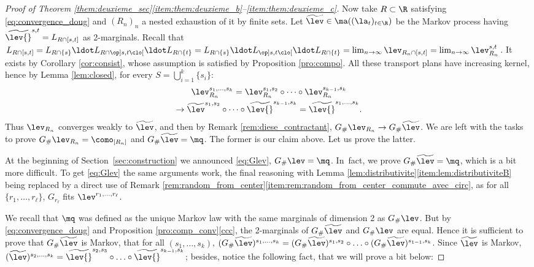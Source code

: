 \begin{proof}[Proof of Theorem \ref{them:deuxieme_sec}\eqref{item:them:deuxieme_b}--\eqref{item:them:deuxieme_c}]
Now take $R\subset \R$ satisfying \eqref{eq:convergence_doug} and $(R_n)_n$ a nested exhaustion of it by finite sets. Let $\widetilde\lev\in\ma((\la_t)_{t\in\R})$ be the Markov process having $\widetilde\lev{}^{s,t}= L_{R\cap[s,t]}$ as 2\nobreakdash-mar\-ginals. Recall that $L_{R\cap[s,t]}=L_{R\cap \{s\}}{}\ldot L_{R\cap\op]s,t\clo[}{}\ldot L_{R\cap \{t\}}=L_{R\cap \{s\}}{}\ldot L_{\op]s,t\clo[}{}\ldot L_{R\cap \{t\}}=\lim_{n\to\infty}\lev_{R_n\cap[s,t]}=\lim_{n\to\infty}\lev_{R_n}^{s,t}$. It exists by Corollary \ref{cor:consist}, whose assumption is satisfied by Proposition \ref{pro:compo}. All these transport plans
have increasing kernel, hence by Lemma \ref{lem:closed}\label{appel_lemme_closed}, for every $S=\bigcup_{i=1}^k\{s_i\}$:
\begin{multline}
\lev_{R_n}^{s_1,\ldots,s_k}=\lev_{R_n}^{s_1,s_2}\circ\cdots\circ \lev_{R_n}^{s_{k-1},s_k}\label{eq:lev_egal_concatenation}\\
\to\widetilde \lev^{s_1,s_2}\circ\cdots\circ \widetilde\lev{}^{s_{k-1},s_k}=\widetilde\lev{}^{s_1,\ldots,s_k}.
\end{multline}
Thus $\lev_{R_n}$ converges weakly to $\widetilde\lev$, and then by Remark \ref{rem:diese_contractant}, $G_\# \lev_{R_n}\to G_\# \widetilde\lev$. We are left with the tasks to prove $G_\# \lev_{R_n}=\como_{[R_n]}$ and $G_\# \widetilde\lev=\mq$. The former is our claim above. Let us prove the latter.

\begin{note}
\label{lieu_preuve_glev} At the beginning of Section~\ref{sec:construction} we announced \eqref{eq:Glev}, \ie $G_\#\lev=\mq$. In~fact, we prove $G_\# \widetilde\lev=\mq$, which is a bit more difficult. To get \eqref{eq:Glev} the same arguments work, the final reasoning with Lemma \ref{lem:distributivite}\eqref{item:lem:distributiviteB} being replaced by a direct use of Remark \ref{rem:random_from_center}\eqref{item:rem:random_from_center_commute_avec_circ}, as for all $\{r_1,\ldots,r_\ell\}$, $G_{r_\ell}$ fits $\lev^{r_1,\ldots,r_\ell}$.
\end{note}

We recall that $\mq$ was defined as the unique Markov law with the same marginals of dimension 2 as $G_\# \lev$. But by \eqref{eq:convergence_doug} and Proposition \ref{pro:comp_conv}\eqref{ccc}, the 2-marginals of $G_\#\widetilde\lev$ and $G_\#\lev$ are equal. Hence it is sufficient to prove that
$G_\# \widetilde \lev$ is Markov, \ie that for all $(s_1,\ldots,s_k)$, $(G_\#\widetilde\lev)^{s_1,\ldots,s_k}=(G_\#\widetilde\lev)^{s_1,s_2}\circ\ldots\circ(G_\#\widetilde\lev)^{s_{1-1},s_k}$. Since $\widetilde\lev$ is Markov, $(\widetilde\lev)^{s_{2},\ldots,s_{k}}=\widetilde\lev{}^{s_{2},s_{3}}\circ\ldots\circ\widetilde\lev{}^{s_{k-1},s_{k}}$; besides, notice the following fact, that we will prove a bit below:


\end{proof}
